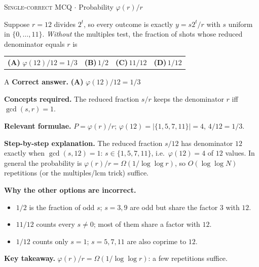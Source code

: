 \documentclass[11pt,a4paper]{article}
\newcommand{\optlabel}[1]{\textbf{(#1)}}
\newcommand{\correctlabel}[1]{\textcolor{okgreen}{\textbf{(#1)}\,\ding{51}}}
\newenvironment{qitem}[1]{\begin{list}{}{\setlength{\leftmargin}{3.3em}\setlength{\labelwidth}{3.1em}%
  \setlength{\labelsep}{0.2em}\setlength{\topsep}{3pt}\setlength{\parsep}{3pt}}\item[\textbf{Q.#1}\hfill]}{\end{list}}
\newcommand{\qsep}{\par\vspace{2pt}{\color{black!15}\hrule}\vspace{4pt}}
\newcommand{\qmeta}[2]{{\footnotesize\color{black!60}\textsc{#1} \;$\cdot$\; #2}\par}
\begin{document}
\begin{qitem}{52}
\qmeta{Single-correct MCQ}{Probability $\varphi(r)/r$}
Suppose $r = 12$ divides $2^t$, so every outcome is exactly $y = s2^t/r$ with $s$ uniform in $\{0, \dots, 11\}$. \emph{Without} the multiples test,
the fraction of shots whose reduced denominator equals $r$ is
\par\smallskip\noindent\begin{tabularx}{\linewidth}{@{}*{4}{L}@{}}
\correctlabel{A}\,$\varphi(12)/12 = 1/3$ & \optlabel{B}\,$1/2$ & \optlabel{C}\,$11/12$ & \optlabel{D}\,$1/12$
\end{tabularx}
\end{qitem}
\begin{solbox}{A}
\textbf{\color{brand}Correct answer.} \textcolor{okgreen}{\textbf{(A)}} $\varphi(12)/12 = 1/3$

\textbf{\color{brand}Concepts required.} The reduced fraction $s/r$ keeps the denominator $r$ iff $\gcd(s, r) = 1$.

\textbf{\color{brand}Relevant formulae.} $P = \varphi(r)/r$; $\varphi(12) = |\{1, 5, 7, 11\}| = 4$, $4/12 = 1/3$.

\textbf{\color{brand}Step-by-step explanation.} The reduced fraction $s/12$ has denominator $12$ exactly when $\gcd(s, 12) = 1$: $s \in \{1, 5, 7, 11\}$, i.e.\ $\varphi(12) = 4$ of $12$ values. In general the
probability is $\varphi(r)/r = \Omega(1/\log\log r)$, so $O(\log\log N)$ repetitions (or the multiples/lcm trick) suffice.

\textbf{\color{brand}Why the other options are incorrect.}
\begin{itemize}[leftmargin=2.4em, itemsep=1pt, topsep=2pt]
\item[\textbf{(B)}] $1/2$ is the fraction of odd $s$; $s = 3, 9$ are odd but share the factor $3$ with $12$.
\item[\textbf{(C)}] $11/12$ counts every $s \ne 0$; most of them share a factor with $12$.
\item[\textbf{(D)}] $1/12$ counts only $s = 1$; $s = 5, 7, 11$ are also coprime to $12$.
\end{itemize}
\textbf{\color{brand}Key takeaway.} $\varphi(r)/r = \Omega(1/\log\log r)$: a few repetitions suffice.
\end{solbox}
\qsep
\end{document}
